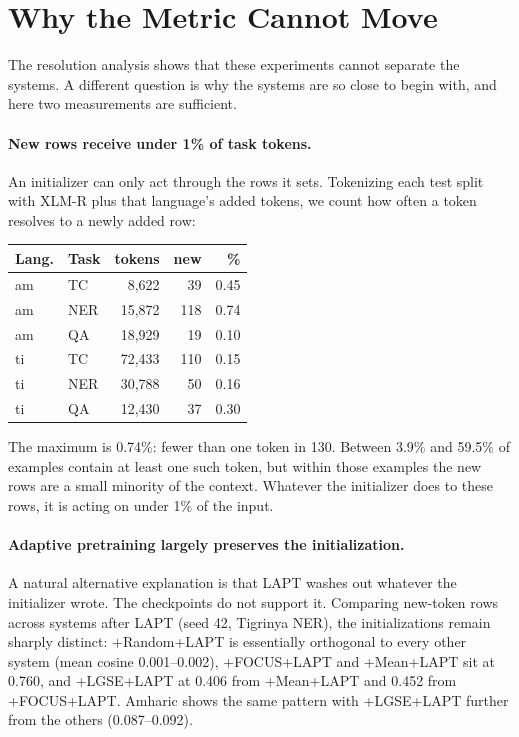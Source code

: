 \documentclass[11pt]{article}
\begin{document}
\section{Why the Metric Cannot Move}
\label{sec:coverage}

The resolution analysis shows that these experiments cannot separate the
systems. A different question is why the systems are so close to begin with,
and here two measurements are sufficient.

\paragraph{New rows receive under 1\% of task tokens.} An initializer can
only act through the rows it sets. Tokenizing each test split with XLM-R plus
that language's added tokens, we count how often a token resolves to a newly
added row:

\begin{center}
\small
\begin{tabular}{llrrr}
\toprule
Lang. & Task & tokens & new & \% \\
\midrule
am & TC  &  8{,}622 & 39 & 0.45 \\
am & NER & 15{,}872 & 118 & 0.74 \\
am & QA  & 18{,}929 & 19 & 0.10 \\
ti & TC  & 72{,}433 & 110 & 0.15 \\
ti & NER & 30{,}788 & 50 & 0.16 \\
ti & QA  & 12{,}430 & 37 & 0.30 \\
\bottomrule
\end{tabular}
\end{center}

The maximum is 0.74\%: fewer than one token in 130. Between 3.9\% and 59.5\%
of examples contain at least one such token, but within those examples the
new rows are a small minority of the context. Whatever the initializer does
to these rows, it is acting on under 1\% of the input.

\paragraph{Adaptive pretraining largely preserves the initialization.} A
natural alternative explanation is that LAPT washes out whatever the
initializer wrote. The checkpoints do not support it. Comparing new-token
rows across systems after LAPT (seed 42, Tigrinya NER), the initializations
remain sharply distinct:
+Random+LAPT is essentially orthogonal to every other system (mean cosine
0.001--0.002), +FOCUS+LAPT and +Mean+LAPT sit at 0.760, and +LGSE+LAPT at
0.406 from +Mean+LAPT and 0.452 from +FOCUS+LAPT. Amharic shows the same
pattern with +LGSE+LAPT further from the others (0.087--0.092).
\end{document}
